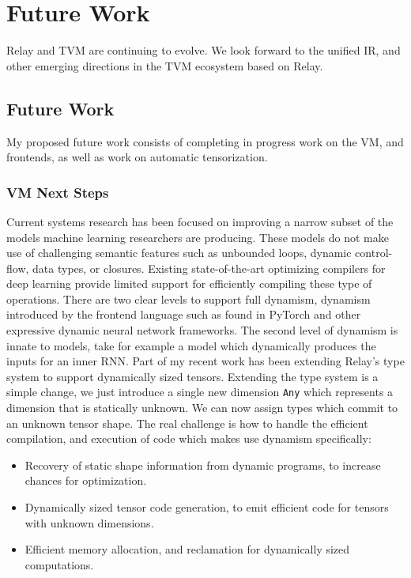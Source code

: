 \chapter{Future Work}
\label{ch:future_work}

Relay and TVM are continuing to evolve.
We look forward to the unified IR,
    and other emerging directions in the TVM ecosystem based on Relay.

    \section{Future Work}
\label{sec:future}


My proposed future work consists of completing in progress work on the VM,
and frontends, as well as work on automatic tensorization.

\subsection{VM Next Steps}

Current systems research has been focused on improving
    a narrow subset of the models machine learning
    researchers are producing.
These models do not make use of
    challenging semantic features such as unbounded
    loops, dynamic control-flow, data types, or
    closures.
Existing state-of-the-art optimizing compilers for deep learning provide
    limited support for efficiently compiling these type of operations.
There are two clear levels to support full dynamism,
    dynamism introduced by the frontend language
    such as found in PyTorch and other expressive
    dynamic neural network frameworks.
The second level of dynamism is innate to models,
    take for example a model which dynamically
    produces the inputs for an inner RNN.
Part of my recent work has been extending Relay's type system to
    support dynamically sized tensors.
Extending the type system is a simple change, we just introduce
    a single new dimension \verb|Any| which represents a dimension
    that is statically unknown.
We can now assign types which commit to an unknown tensor shape.
The real challenge is how to handle the efficient compilation,
    and execution of code which makes use dynamism
    specifically:
\begin{itemize}
    \item Recovery of static shape information from dynamic programs,
          to increase chances for optimization.
    \item Dynamically sized tensor code generation,
          to emit efficient code for tensors with
          unknown dimensions.
    \item Efficient memory allocation, and reclamation
          for dynamically sized computations.
\end{itemize}

